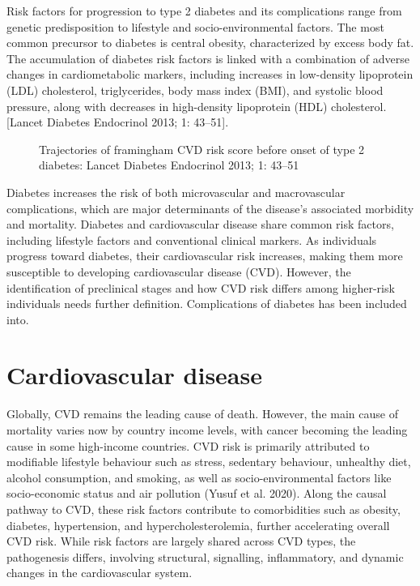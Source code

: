 \documentclass[
  a4paper,
  headsepline=true,
  open=any]{scrbook}
\begin{document}
Risk factors for progression to type 2 diabetes and its complications
range from genetic predisposition to lifestyle and socio-environmental
factors. The most common precursor to diabetes is central obesity,
characterized by excess body fat. The accumulation of diabetes risk
factors is linked with a combination of adverse changes in
cardiometabolic markers, including increases in low-density lipoprotein
(LDL) cholesterol, triglycerides, body mass index (BMI), and systolic
blood pressure, along with decreases in high-density lipoprotein (HDL)
cholesterol. {[}Lancet Diabetes Endocrinol 2013; 1: 43--51{]}.

\begin{figure}

\begin{minipage}[t]{\linewidth}

{\centering 


\caption{Trajectories of framingham CVD risk score before onset of type
2 diabetes: Lancet Diabetes Endocrinol 2013; 1: 43--51}

}

\end{minipage}%

\end{figure}

Diabetes increases the risk of both microvascular and macrovascular
complications, which are major determinants of the disease's associated
morbidity and mortality. Diabetes and cardiovascular disease share
common risk factors, including lifestyle factors and conventional
clinical markers. As individuals progress toward diabetes, their
cardiovascular risk increases, making them more susceptible to
developing cardiovascular disease (CVD). However, the identification of
preclinical stages and how CVD risk differs among higher-risk
individuals needs further definition. Complications of diabetes has been
included into.

\hypertarget{cardiovascular-disease}{%
\section{Cardiovascular disease}\label{cardiovascular-disease}}

Globally, CVD remains the leading cause of death. However, the main
cause of mortality varies now by country income levels, with cancer
becoming the leading cause in some high-income countries. CVD risk is
primarily attributed to modifiable lifestyle behaviour such as stress,
sedentary behaviour, unhealthy diet, alcohol consumption, and smoking,
as well as socio-environmental factors like socio-economic status and
air pollution (Yusuf et al. 2020). Along the causal pathway to CVD,
these risk factors contribute to comorbidities such as obesity,
diabetes, hypertension, and hypercholesterolemia, further accelerating
overall CVD risk. While risk factors are largely shared across CVD
types, the pathogenesis differs, involving structural, signalling,
inflammatory, and dynamic changes in the cardiovascular system.
\end{document}
